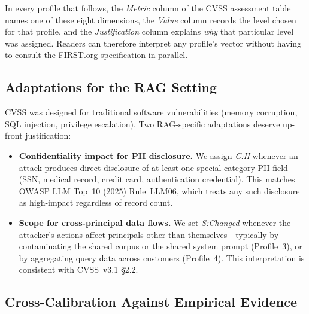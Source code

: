 \documentclass[a4paper,12pt]{report}
\begin{document}
In every profile that follows, the \emph{Metric} column of the CVSS
assessment table names one of these eight dimensions, the \emph{Value}
column records the level chosen for that profile, and the
\emph{Justification} column explains \emph{why} that particular level
was assigned. Readers can therefore interpret any profile's vector
without having to consult the FIRST.org specification in parallel.

\subsection{Adaptations for the RAG Setting}

CVSS was designed for traditional software vulnerabilities (memory
corruption, SQL injection, privilege escalation). Two RAG-specific
adaptations deserve up-front justification:

\begin{itemize}[leftmargin=1.4em, itemsep=3pt]
  \item \textbf{Confidentiality impact for PII disclosure.} We assign
        \emph{C:H} whenever an attack produces direct disclosure of at
        least one special-category PII field (SSN, medical record, credit
        card, authentication credential). This matches OWASP LLM Top~10
        (2025) Rule~LLM06, which treats any such disclosure as
        high-impact regardless of record count.
  \item \textbf{Scope for cross-principal data flows.} We set
        \emph{S:Changed} whenever the attacker's actions affect
        principals other than themselves---typically by contaminating the
        shared corpus or the shared system prompt (Profile~3), or by
        aggregating query data across customers (Profile~4). This
        interpretation is consistent with CVSS~v3.1 \S2.2.
\end{itemize}

\subsection{Cross-Calibration Against Empirical Evidence}
\end{document}
